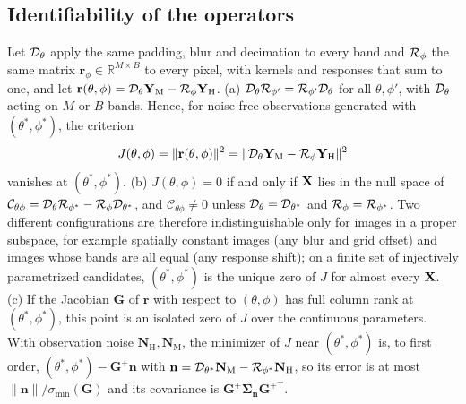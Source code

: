 \documentclass[journal]{IEEEtran}
\begin{document}
\subsection{Identifiability of the operators}
\label{sec:ident}
\begin{theorem}
\label{thm:ident}
Let $\mathcal{D}_\theta$ apply the same padding, blur and decimation to every band and $\mathcal{R}_\phi$ the same matrix $\mathbf{r}_\phi\in\mathbb{R}^{M\times B}$ to every pixel, with kernels and responses that sum to one, and let $\mathbf{r}(\theta,\phi)=\mathcal{D}_\theta\mathbf{Y}_{\mathrm{M}}-\mathcal{R}_\phi\mathbf{Y}_{\mathrm{H}}$. (a) $\mathcal{D}_\theta\mathcal{R}_{\phi'}=\mathcal{R}_{\phi'}\mathcal{D}_\theta$ for all $\theta,\phi'$, with $\mathcal{D}_\theta$ acting on $M$ or $B$ bands. Hence, for noise-free observations generated with $(\theta^*,\phi^*)$, the criterion
\begin{equation}
J(\theta,\phi)=\|\mathbf{r}(\theta,\phi)\|^2=\|\mathcal{D}_\theta\mathbf{Y}_{\mathrm{M}}-\mathcal{R}_\phi\mathbf{Y}_{\mathrm{H}}\|^2
\label{eq:J}
\end{equation}
vanishes at $(\theta^*,\phi^*)$. (b) $J(\theta,\phi)=0$ if and only if $\mathbf{X}$ lies in the null space of $\mathcal{C}_{\theta\phi}=\mathcal{D}_\theta\mathcal{R}_{\phi^*}-\mathcal{R}_\phi\mathcal{D}_{\theta^*}$, and $\mathcal{C}_{\theta\phi}\neq0$ unless $\mathcal{D}_\theta=\mathcal{D}_{\theta^*}$ and $\mathcal{R}_\phi=\mathcal{R}_{\phi^*}$. Two different configurations are therefore indistinguishable only for images in a proper subspace, for example spatially constant images (any blur and grid offset) and images whose bands are all equal (any response shift); on a finite set of injectively parametrized candidates, $(\theta^*,\phi^*)$ is the unique zero of $J$ for almost every $\mathbf{X}$. (c) If the Jacobian $\mathbf{G}$ of $\mathbf{r}$ with respect to $(\theta,\phi)$ has full column rank at $(\theta^*,\phi^*)$, this point is an isolated zero of $J$ over the continuous parameters. With observation noise $\mathbf{N}_{\mathrm{H}},\mathbf{N}_{\mathrm{M}}$, the minimizer of $J$ near $(\theta^*,\phi^*)$ is, to first order, $(\theta^*,\phi^*)-\mathbf{G}^{+}\mathbf{n}$ with $\mathbf{n}=\mathcal{D}_{\theta^*}\mathbf{N}_{\mathrm{M}}-\mathcal{R}_{\phi^*}\mathbf{N}_{\mathrm{H}}$, so its error is at most $\|\mathbf{n}\|/\sigma_{\min}(\mathbf{G})$ and its covariance is $\mathbf{G}^{+}\boldsymbol{\Sigma}_{\mathbf{n}}\mathbf{G}^{+\top}$.
\end{theorem}
\end{document}
